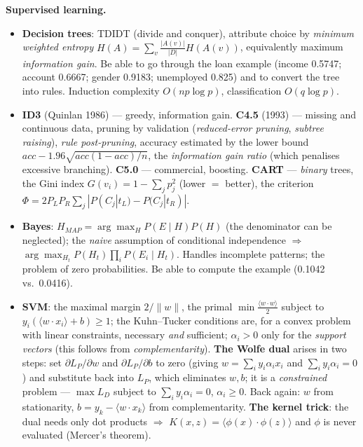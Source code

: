 \documentclass[11pt,a4paper]{article}
\theoremstyle{definition}
\begin{document}
\textbf{Supervised learning.}
\begin{itemize}
\item \textbf{Decision trees}: TDIDT (divide and conquer), attribute choice by \emph{minimum
      weighted entropy} $H(A)=\sum_v\frac{|A(v)|}{|D|}H(A(v))$, equivalently maximum
      \emph{information gain}. Be able to go through the loan example (income 0.5747; account
      0.6667; gender 0.9183; unemployed 0.825) and to convert the tree into rules. Induction
      complexity $O(np\log p)$, classification $O(q\log p)$.
\item \textbf{ID3} (Quinlan 1986) --- greedy, information gain. \textbf{C4.5} (1993) --- missing
      and continuous data, pruning by validation (\emph{reduced-error pruning}, \emph{subtree
      raising}), \emph{rule post-pruning}, accuracy estimated by the lower bound
      $\mathit{acc}-1.96\sqrt{\mathit{acc}(1-\mathit{acc})/n}$, the \emph{information gain ratio}
      (which penalises excessive branching). \textbf{C5.0} --- commercial, boosting.
      \textbf{CART} --- \emph{binary} trees, the Gini index $G(v_i)=1-\sum_j p_j^2$ (lower $=$
      better), the criterion $\Phi=2P_LP_R\sum_j|P(C_j|t_L)-P(C_j|t_R)|$.
\item \textbf{Bayes}: $H_{MAP}=\arg\max_H P(E\mid H)P(H)$ (the denominator can be neglected); the
      \emph{naive} assumption of conditional independence $\Rightarrow$
      $\arg\max_{H_t}P(H_t)\prod_i P(E_i\mid H_t)$. Handles incomplete patterns; the problem of
      zero probabilities. Be able to compute the example (0.1042 vs.\ 0.0416).
\item \textbf{SVM}: the maximal margin $2/\|w\|$, the primal $\min\frac{\langle w\cdot
      w\rangle}{2}$ subject to $y_i(\langle w\cdot x_i\rangle+b)\ge 1$; the Kuhn--Tucker conditions
      are, for a convex problem with linear constraints, necessary \emph{and} sufficient;
      $\alpha_i>0$ only for the \emph{support vectors} (this follows from \emph{complementarity}).
      \textbf{The Wolfe dual} arises in two steps: set $\partial L_P/\partial w$ and
      $\partial L_P/\partial b$ to zero (giving $w=\sum_i y_i\alpha_i x_i$ and
      $\sum_i y_i\alpha_i=0$) and substitute back into $L_P$, which eliminates $w,b$; it is a
      \emph{constrained} problem --- $\max L_D$ subject to $\sum_i y_i\alpha_i=0$,
      $\alpha_i\ge 0$. Back again: $w$ from stationarity,
      $b=y_k-\langle w\cdot x_k\rangle$ from complementarity.
      \textbf{The kernel trick}:
      the dual needs only dot products $\Rightarrow$
      $K(x,z)=\langle\phi(x)\cdot\phi(z)\rangle$ and $\phi$ is never evaluated (Mercer's theorem).

\end{itemize}
\end{document}
